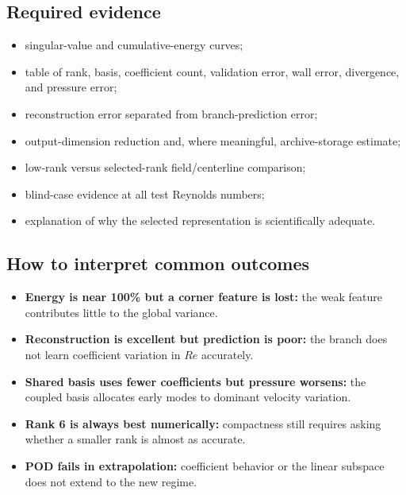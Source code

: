 \documentclass[11pt]{article}
\begin{document}
\subsection{Required evidence}
\begin{itemize}
\item singular-value and cumulative-energy curves;
\item table of rank, basis, coefficient count, validation error, wall error, divergence, and pressure error;
\item reconstruction error separated from branch-prediction error;
\item output-dimension reduction and, where meaningful, archive-storage estimate;
\item low-rank versus selected-rank field/centerline comparison;
\item blind-case evidence at all test Reynolds numbers;
\item explanation of why the selected representation is scientifically adequate.
\end{itemize}

\subsection{How to interpret common outcomes}
\begin{itemize}
\item \textbf{Energy is near 100\% but a corner feature is lost:} the weak feature contributes little to the global variance.
\item \textbf{Reconstruction is excellent but prediction is poor:} the branch does not learn coefficient variation in $Re$ accurately.
\item \textbf{Shared basis uses fewer coefficients but pressure worsens:} the coupled basis allocates early modes to dominant velocity variation.
\item \textbf{Rank 6 is always best numerically:} compactness still requires asking whether a smaller rank is almost as accurate.
\item \textbf{POD fails in extrapolation:} coefficient behavior or the linear subspace does not extend to the new regime.
\end{itemize}
\end{document}
